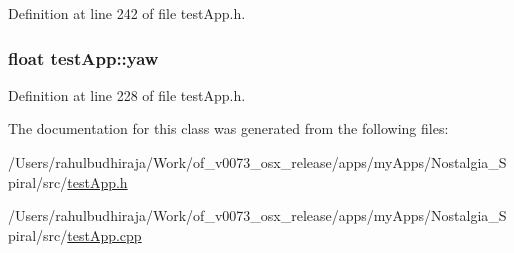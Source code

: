 Definition at line 242 of file test\-App.\-h.

\hypertarget{classtest_app_a865985f78dd5def3ed20c87b9fc772b6}{
\subsubsection[{yaw}]{\setlength{\rightskip}{0pt plus 5cm}float test\-App\-::yaw}}\label{classtest_app_a865985f78dd5def3ed20c87b9fc772b6}


Definition at line 228 of file test\-App.\-h.



The documentation for this class was generated from the following files\-:\begin{DoxyCompactItemize}
\item 
/\-Users/rahulbudhiraja/\-Work/of\-\_\-v0073\-\_\-osx\-\_\-release/apps/my\-Apps/\-Nostalgia\-\_\-\-Spiral/src/\hyperlink{test_app_8h}{test\-App.\-h}\item 
/\-Users/rahulbudhiraja/\-Work/of\-\_\-v0073\-\_\-osx\-\_\-release/apps/my\-Apps/\-Nostalgia\-\_\-\-Spiral/src/\hyperlink{test_app_8cpp}{test\-App.\-cpp}\end{DoxyCompactItemize}
